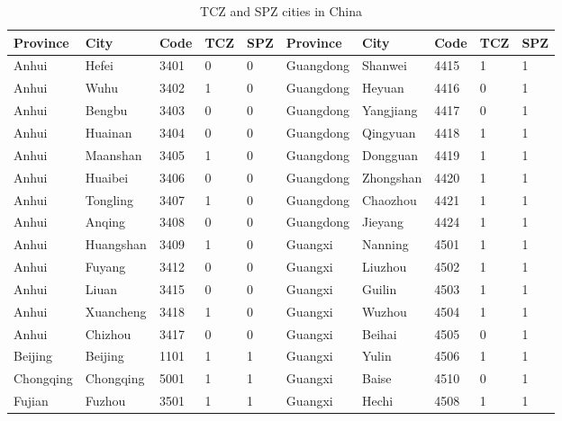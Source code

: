 \documentclass[12pt]{article}
\begin{document}
\begin{table}[!htb] \centering
  \caption{TCZ and SPZ cities in China}
  \begin{adjustbox}{width=\textwidth, totalheight=\baselineskip,keepaspectratio}
    \label{tab:appendix1}
\begin{tabular}{llllllllll}
\hline
Province  & City      & Code & TCZ & SPZ & Province     & City          & Code & TCZ & SPZ \\
\hline
Anhui     & Hefei     & 3401 & 0   & 0   & Guangdong    & Shanwei       & 4415 & 1   & 1   \\
Anhui     & Wuhu      & 3402 & 1   & 0   & Guangdong    & Heyuan        & 4416 & 0   & 1   \\
Anhui     & Bengbu    & 3403 & 0   & 0   & Guangdong    & Yangjiang     & 4417 & 0   & 1   \\
Anhui     & Huainan   & 3404 & 0   & 0   & Guangdong    & Qingyuan      & 4418 & 1   & 1   \\
Anhui     & Maanshan  & 3405 & 1   & 0   & Guangdong    & Dongguan      & 4419 & 1   & 1   \\
Anhui     & Huaibei   & 3406 & 0   & 0   & Guangdong    & Zhongshan     & 4420 & 1   & 1   \\
Anhui     & Tongling  & 3407 & 1   & 0   & Guangdong    & Chaozhou      & 4421 & 1   & 1   \\
Anhui     & Anqing    & 3408 & 0   & 0   & Guangdong    & Jieyang       & 4424 & 1   & 1   \\
Anhui     & Huangshan & 3409 & 1   & 0   & Guangxi      & Nanning       & 4501 & 1   & 1   \\
Anhui     & Fuyang    & 3412 & 0   & 0   & Guangxi      & Liuzhou       & 4502 & 1   & 1   \\
Anhui     & Liuan     & 3415 & 0   & 0   & Guangxi      & Guilin        & 4503 & 1   & 1   \\
Anhui     & Xuancheng & 3418 & 1   & 0   & Guangxi      & Wuzhou        & 4504 & 1   & 1   \\
Anhui     & Chizhou   & 3417 & 0   & 0   & Guangxi      & Beihai        & 4505 & 0   & 1   \\
Beijing   & Beijing   & 1101 & 1   & 1   & Guangxi      & Yulin         & 4506 & 1   & 1   \\
Chongqing & Chongqing & 5001 & 1   & 1   & Guangxi      & Baise         & 4510 & 0   & 1   \\
Fujian    & Fuzhou    & 3501 & 1   & 1   & Guangxi      & Hechi         & 4508 & 1   & 1   \\

\end{tabular}
\end{adjustbox}
\end{table}
\end{document}
